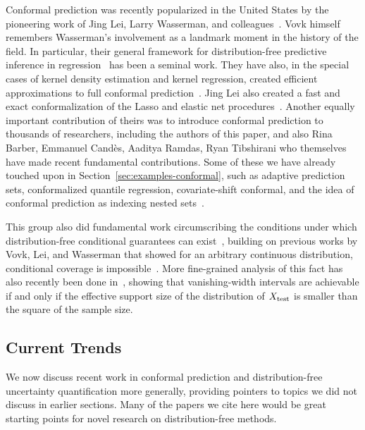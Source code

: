 \documentclass[10pt]{article}
\begin{document}
Conformal prediction was recently popularized in the United States by the pioneering work of Jing Lei, Larry Wasserman, and colleagues~\cite{lei2011efficient,lei2014distribution,lei2013distribution,poczos2013distribution,lei2014distribution, lei2018distribution}.
Vovk himself remembers Wasserman's involvement as a landmark moment in the history of the field.
In particular, their general framework for distribution-free predictive inference in regression~\cite{lei2018distribution} has been a seminal work.
They have also, in the special cases of kernel density estimation and kernel regression, created efficient approximations to full conformal prediction~\cite{lei2013conformal,lei2014distribution}.
Jing Lei also created a fast and exact conformalization of the Lasso and elastic net procedures~\cite{lei2019fast}.
Another equally important contribution of theirs was to introduce conformal prediction to thousands of researchers, including the authors of this paper, and also Rina Barber, Emmanuel Cand\`es, Aaditya Ramdas, Ryan Tibshirani who themselves have made recent fundamental contributions.
Some of these we have already touched upon in Section~\ref{sec:examples-conformal}, such as adaptive prediction sets, conformalized quantile regression, covariate-shift conformal, and the idea of conformal prediction as indexing nested sets~\cite{gupta2020nested}.

This group also did fundamental work circumscribing the conditions under which distribution-free conditional guarantees can exist~\cite{foygel2021limits}, building on previous works by Vovk, Lei, and Wasserman that showed for an arbitrary continuous distribution, conditional coverage is impossible~\cite{vovk2012conditional,lei2014distribution,lei2018distribution}.
More fine-grained analysis of this fact has also recently been done in~\cite{lee2021distribution}, showing that vanishing-width intervals are achievable if and only if the effective support size of the distribution of $X_{\rm test}$ is smaller than the square of the sample size.

\subsection*{Current Trends}
We now discuss recent work in conformal prediction and distribution-free uncertainty quantification more generally, providing pointers to topics we did not discuss in earlier sections.
Many of the papers we cite here would be great starting points for novel research on distribution-free methods.
\end{document}
